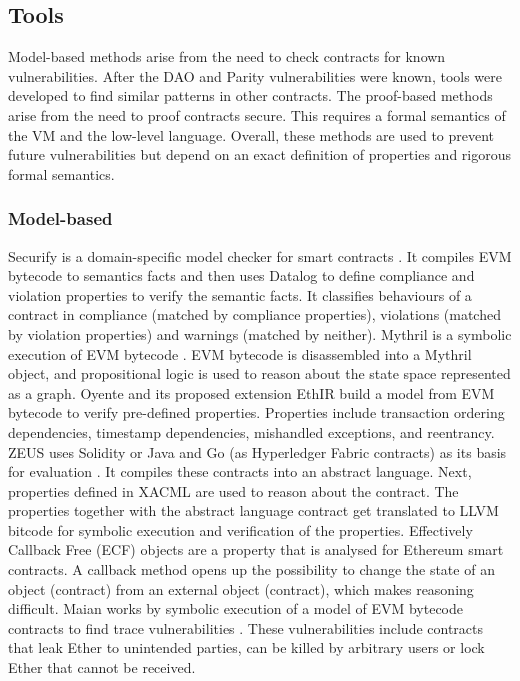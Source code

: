 


\subsection{Tools}
Model-based methods arise from the need to check contracts for known vulnerabilities. After the DAO and Parity vulnerabilities were known, tools were developed to find similar patterns in other contracts. The proof-based methods arise from the need to proof contracts secure. This requires a formal semantics of the VM and the low-level language. Overall, these methods are used to prevent future vulnerabilities but depend on an exact definition of properties and rigorous formal semantics.

\subsubsection{Model-based}
Securify is a domain-specific model checker for smart contracts \cite{Tsankov2017}. It compiles EVM bytecode to semantics facts and then uses Datalog to define compliance and violation properties to verify the semantic facts. It classifies behaviours of a contract in compliance (matched by compliance properties), violations (matched by violation properties) and warnings (matched by neither). 
Mythril is a symbolic execution of EVM bytecode \cite{Mueller2018}. EVM bytecode is disassembled into a Mythril object, and propositional logic is used to reason about the state space represented as a graph. 
Oyente \cite{Luu2016} and its proposed extension EthIR \cite{Albert2018} build a model from EVM bytecode to verify pre-defined properties. Properties include transaction ordering dependencies, timestamp dependencies, mishandled exceptions, and reentrancy.
ZEUS uses Solidity or Java and Go (as Hyperledger Fabric contracts) as its basis for evaluation \cite{Kalra2018}. It compiles these contracts into an abstract language. Next, properties defined in XACML are used to reason about the contract. The properties together with the abstract language contract get translated to LLVM bitcode for symbolic execution and verification of the properties.
Effectively Callback Free (ECF) objects are a property that is analysed for Ethereum smart contracts\cite{Grossman2017}. A callback method opens up the possibility to change the state of an object (contract) from an external object (contract), which makes reasoning difficult. 
Maian works by symbolic execution of a model of EVM bytecode contracts to find trace vulnerabilities \cite{Nikolic2018}. These vulnerabilities include contracts that leak Ether to unintended parties, can be killed by arbitrary users or lock Ether that cannot be received. 

